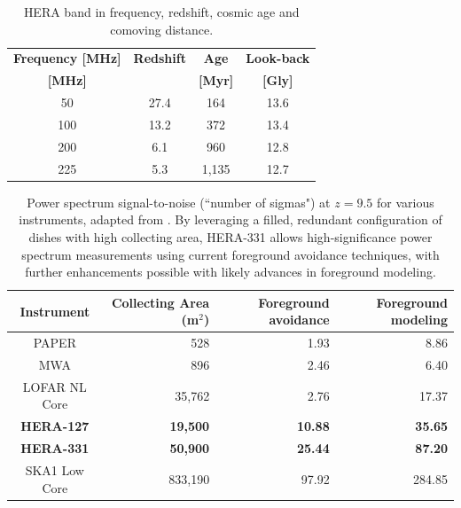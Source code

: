 \documentclass[ars]{copernicus}
\begin{document}
\begin{table}[t]
\caption{HERA band in frequency, redshift, cosmic age and comoving distance.}
\label{tab:heraband}
\vskip4mm
\centering
\begin{tabular}{| c | c | c | c |} \hline
\textbf{Frequency [MHz]} & \textbf{Redshift} & \textbf{Age} & \textbf{Look-back} \\
\textbf{[MHz]}                   &                            & \textbf{[Myr]}  & \textbf{[Gly]} \\ \hline
50 & 27.4    & 164 & 13.6 \\ \hline
100 & 13.2  & 372 & 13.4 \\ \hline
200  & 6.1    & 960  & 12.8 \\ \hline
225  &  5.3   & 1,135  &  12.7 \\ \hline
\end{tabular}
\end{table}

\begin{table}[t]
\small
 \centering
 \begin{tabular}{c||r||r|r} 
\hline
Instrument & Collecting Area (m$^2$) & Foreground avoidance & Foreground modeling \\
\hline
PAPER & 528 & 1.93 & 8.86 \\
MWA & 896 & 2.46 & 6.40 \\
LOFAR NL Core & 35,762 & 2.76 & 17.37 \\
\textbf{HERA-127} & \textbf{19,500} & \textbf{10.88} & \textbf{35.65} \\
\textbf{HERA-331} & \textbf{50,900} & \textbf{25.44} & \textbf{87.20} \\
SKA1 Low Core & 833,190 & 97.92 & 284.85 \\
\end{tabular}
\caption{Power spectrum signal-to-noise (``number of sigmas") at $z=9.5$ for various instruments, adapted from \citet{pober_et_al2014}.  By leveraging a filled, redundant configuration of dishes with high collecting area, HERA-331 allows high-significance power spectrum measurements using current foreground avoidance techniques, with further enhancements possible with likely advances in foreground modeling.}
\label{tab:signif}
\end{table}
\end{document}

